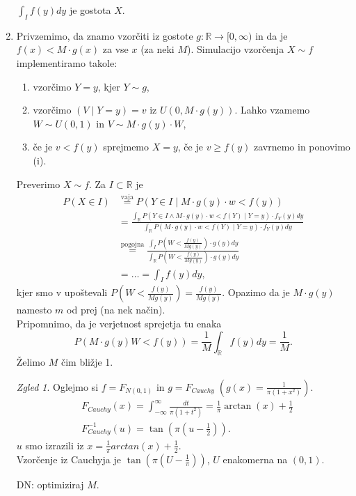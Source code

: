 \documentclass[a4paper, 12pt]{book}
\theoremstyle{definition}
\theoremstyle{remark}
\newtheorem*{exmp}{Zgled}
\newcommand{\R}{\mathbb{R}}
\begin{document}
\begin{enumerate}[label={A/R \#\arabic{*}:}]
    $\int_I f(y) dy$ je gostota $X$.
  \item Privzemimo, da znamo vzorčiti iz gostote $g: \R \to [0,\infty)$ in da je $f(x) < M \cdot g(x)$ za vse $x$ (za neki $M$).
    Simulacijo vzorčenja $X \sim f$ implementiramo takole:
    \begin{enumerate}[label=(\roman*)]
      \item vzorčimo $Y=y$, kjer $Y \sim g$,
      \item vzorčimo $(V \mid Y=y) = v$ iz $U(0,M \cdot g(y))$.
        Lahko vzamemo $W \sim U(0,1)$ in $V \sim M \cdot g(y) \cdot W$,
      \item če je $v < f(y)$ sprejmemo $X=y$, če je $v \geq f(y)$ zavrnemo in ponovimo (i).
    \end{enumerate}
    Preverimo $X \sim f$. Za $I \subset \R$ je
    \begin{align*}
      P(X \in I) &\stackrel{\text{vaja}}{=} P(Y \in I \mid M \cdot g(y) \cdot w < f(y)) \\
      &= \frac{\int_{\R} P(Y \in I \land M \cdot g(y) \cdot w < f(Y) \mid Y=y) \cdot f_Y(y) dy}
        {\int_{\R} P(M \cdot g(y) \cdot w < f(Y) \mid Y=y) \cdot f_Y(y) dy} \\
      &\stackrel{\text{pogojna}}{=} \frac{\int_{I} P(W < \frac{f(y)}{Mg(y)}) \cdot g(y) dy}
        {\int_{\R} P(W < \frac{f(y)}{Mg(y)}) \cdot g(y) dy} \\
      &= \dots = \int_I f(y) dy,
    \end{align*}
    kjer smo v upoštevali $P(W < \frac{f(y)}{Mg(y)}) = \frac{f(y)}{Mg(y)}$.
    Opazimo da je $M \cdot g(y)$ namesto $m$ od prej (na nek način). \\
    Pripomnimo, da je verjetnost sprejetja tu enaka
    \begin{equation*}
      P(M \cdot g(y) W < f(y)) = \frac{1}{M} \int_{\R} f(y) dy = \frac{1}{M}.
    \end{equation*}
    Želimo $M$ čim bližje 1.
    \begin{exmp}
      Oglejmo si $f = F_{N(0,1)}$ in $g = F_{Cauchy} \; \left(g(x) = \frac{1}{\pi(1+x^2)}\right)$.
      \begin{align*}
        &F_{Cauchy}(x) = \int_{-\infty}^{\infty} \frac{dt}{\pi(1+t^2)} = \frac{1}{\pi} \arctan(x) + \frac{1}{2} \\
        &F_{Cauchy}^{-1}(u) = \tan(\pi\left(u-\frac{1}{2}\right)).
      \end{align*}
      $u$ smo izrazili iz $x = \frac{1}{\pi} arctan(x) + \frac{1}{2}$. \\
      Vzorčenje iz Cauchyja je $\tan(\pi(U-\frac{1}{\pi}))$, $U$ enakomerna na $(0,1)$.
    \end{exmp}
    DN: optimiziraj $M$. %
\end{enumerate}



%
%



\end{document}
